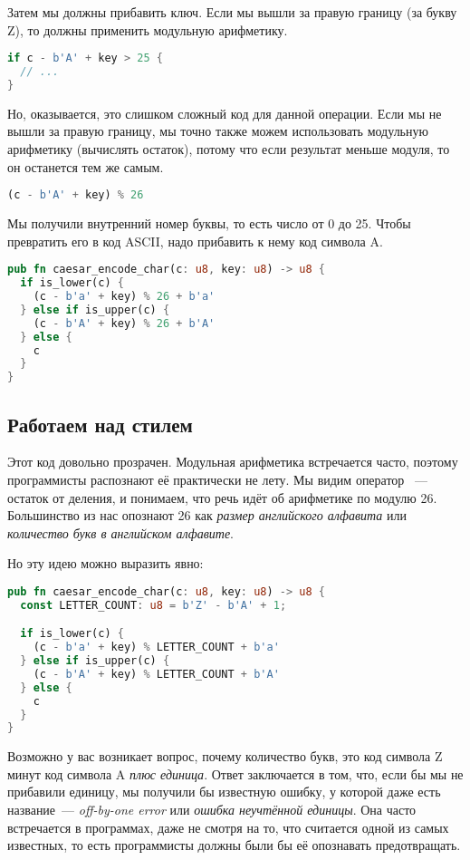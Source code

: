 Затем мы должны прибавить ключ.
Если мы вышли за правую границу (за букву Z), то должны применить модульную арифметику.

\begin{lstlisting}[language=Rust]
if c - b'A' + key > 25 {
  // ...
}
\end{lstlisting}

Но, оказывается, это слишком сложный код для данной операции.
Если мы не вышли за правую границу, мы точно также можем использовать модульную арифметику (вычислять остаток), потому что если результат меньше модуля, то он останется тем же самым.

\begin{lstlisting}[language=Rust]
(c - b'A' + key) % 26
\end{lstlisting}

Мы получили внутренний номер буквы, то есть число от 0 до 25. Чтобы превратить его в код ASCII, надо прибавить к нему код символа A.

\begin{lstlisting}[language=Rust]
pub fn caesar_encode_char(c: u8, key: u8) -> u8 {
  if is_lower(c) {
    (c - b'a' + key) % 26 + b'a'
  } else if is_upper(c) {
    (c - b'A' + key) % 26 + b'A'
  } else {
    c
  }
}
\end{lstlisting}

\subsection{Работаем над стилем}

Этот код довольно прозрачен.
Модульная арифметика встречается часто, поэтому программисты распознают её практически не лету.
Мы видим оператор \code{\%}~--- остаток от деления, и понимаем, что речь идёт об арифметике по модулю 26.
Большинство из нас опознают 26 как {\em размер английского алфавита} или {\em количество букв в английском алфавите}.

Но эту идею можно выразить явно:

\begin{lstlisting}[language=Rust]
pub fn caesar_encode_char(c: u8, key: u8) -> u8 {
  const LETTER_COUNT: u8 = b'Z' - b'A' + 1;

  if is_lower(c) {
    (c - b'a' + key) % LETTER_COUNT + b'a'
  } else if is_upper(c) {
    (c - b'A' + key) % LETTER_COUNT + b'A'
  } else {
    c
  }
}
\end{lstlisting}

Возможно у вас возникает вопрос, почему количество букв, это код символа Z минут код символа A {\em плюс единица}.
Ответ заключается в том, что, если бы мы не прибавили единицу, мы получили бы известную ошибку, у которой даже есть название — {\em off-by-one error} или {\em ошибка неучтённой единицы}.
Она часто встречается в программах, даже не смотря на то, что считается одной из самых известных, то есть программисты должны были бы её опознавать предотвращать.

